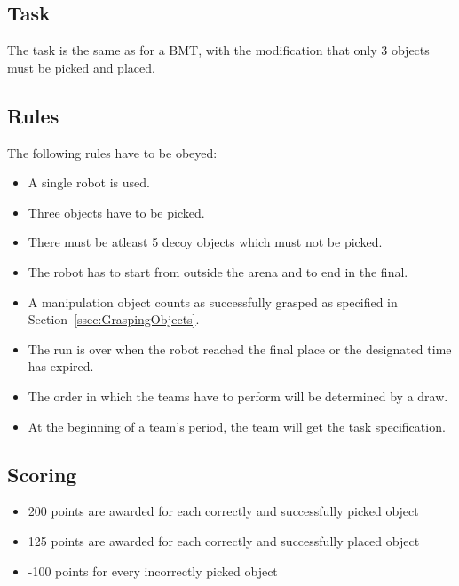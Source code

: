\subsection{Task}

The task is the same as for a BMT, with the modification that only 3 objects must be picked and placed.

\subsection{Rules}
The following rules have to be obeyed:

\begin{itemize}
\item A single robot is used.
\item Three objects have to be picked.
\item There must be atleast 5 decoy objects which must not be picked.
\item The robot has to start from outside the arena and to end in the final.
\item A manipulation object counts as successfully grasped as specified in Section~\ref{ssec:GraspingObjects}.
\item The run is over when the robot reached the final place or the designated time has expired.
\item The order in which the teams have to perform will be determined by a draw.
\item At the beginning of a team's period, the team will get the task specification.
\end{itemize}

\subsection{Scoring}
\begin{itemize}
\item 200 points are awarded for each correctly and successfully picked object
\item 125 points are awarded for each correctly and successfully placed object
\item -100 points for every incorrectly picked object
\end{itemize}
